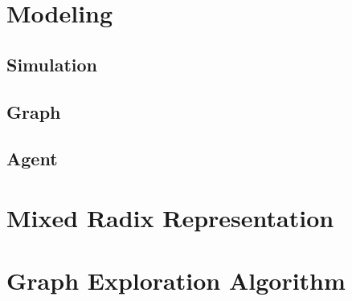 
\section{Modeling}
\label{section_method_modeling}

\subsection{Simulation}
\label{section_modeling_simulation}

\subsection{Graph}
\label{section_modeling_graph}

\subsection{Agent}
\label{section_modeling_agent}

\section{Mixed Radix Representation}
\label{section_method_mixed_radix}

\section{Graph Exploration Algorithm}
\label{section_method_}
